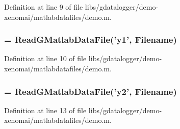 Definition at line 9 of file libs/gdatalogger/demo-\/xenomai/matlabdatafiles/demo.m.
\subsubsection[{y1}]{ = ReadGMatlabDataFile('{\bf y1}', {\bf Filename})}\label{libs_2gdatalogger_2demo-xenomai_2matlabdatafiles_2demo_8m_a7f911dc1dbbc41c6cae56357e8fb2230}


Definition at line 10 of file libs/gdatalogger/demo-\/xenomai/matlabdatafiles/demo.m.
\subsubsection[{y2}]{ = ReadGMatlabDataFile('{\bf y2}', {\bf Filename})}\label{libs_2gdatalogger_2demo-xenomai_2matlabdatafiles_2demo_8m_a41b94b12b7cb45b3ddee299d4e7b79e8}


Definition at line 13 of file libs/gdatalogger/demo-\/xenomai/matlabdatafiles/demo.m.